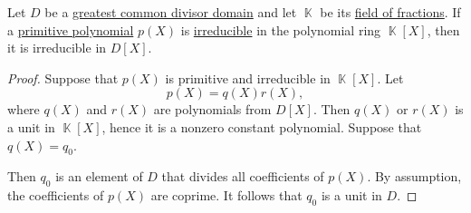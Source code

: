 \begin{lemma}\label{thm:irreducible_primitive_polynomial_in_field_of_fractions}
  Let \( D \) be a \hyperref[def:greatest_common_divisor_domain]{greatest common divisor domain} and let \( \BbbK \) be its \hyperref[thm:field_of_fractions]{field of fractions}. If a \hyperref[def:polynomial_content]{primitive polynomial} \( p(X) \) is \hyperref[def:domain_divisibility/irreducible]{irreducible} in the polynomial ring \( \BbbK[X] \), then it is irreducible in \( D[X] \).
\end{lemma}
\begin{proof}
   Suppose that \( p(X) \) is primitive and irreducible in \( \BbbK[X] \). Let
  \begin{equation*}
    p(X) = q(X) r(X),
  \end{equation*}
  where \( q(X) \) and \( r(X) \) are polynomials from \( D[X] \). Then \( q(X) \) or \( r(X) \) is a unit in \( \BbbK[X] \), hence it is a nonzero constant polynomial. Suppose that \( q(X) = q_0 \).

  Then \( q_0 \) is an element of \( D \) that divides all coefficients of \( p(X) \). By assumption, the coefficients of \( p(X) \) are coprime. It follows that \( q_0 \) is a unit in \( D \).
\end{proof}

